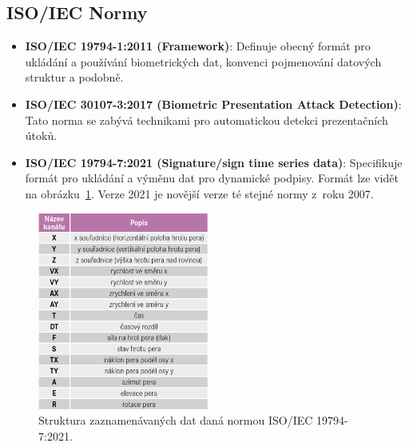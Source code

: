 \subsection*{ISO/IEC Normy}
\begin{itemize}
  \item \textbf{ISO/IEC 19794-1:2011 (Framework)}: 
  Definuje obecný formát pro ukládání a používání biometrických dat, konvenci pojmenování datových struktur a podobně.\cite{iso19794-1_2011} %

  \item \textbf{ISO/IEC 30107-3:2017 (Biometric Presentation Attack Detection)}: 
  Tato norma se zabývá technikami pro automatickou detekci prezentačních útoků.~\cite{ISO/IEC30107-3_2017} %

  \item \textbf{ISO/IEC 19794-7:2021 (Signature/sign time series data)}:
  Specifikuje formát pro ukládání a výměnu dat pro dynamické podpisy. 
  Formát lze vidět na obrázku~\ref{fig:norms_table}. 
  Verze 2021 je novější verze té stejné normy z~roku 2007.~\cite{ISOIEC19794-7_2021} %
\end{itemize}

\begin{figure}[H]
  \centering
  \includegraphics[width=0.5\textwidth]{obrazky-figures/normy.png}
  \caption{Struktura zaznamenávaných dat daná normou ISO/IEC 19794-7:2021.~\cite{DSM2021}} %
  \label{fig:norms_table}
\end{figure}


